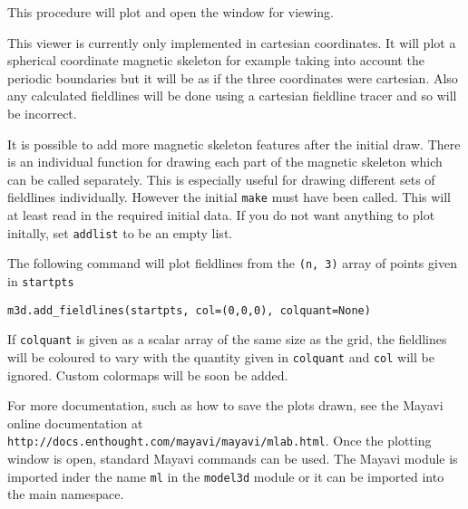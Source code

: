\documentclass[12pt]{article}
\begin{document}
      This procedure will plot and open the window for viewing.

      This viewer is currently only implemented in cartesian coordinates. It will plot a spherical coordinate magnetic skeleton for example taking into account the periodic boundaries but it will be as if the three coordinates were cartesian. Also any calculated fieldlines will be done using a cartesian fieldline tracer and so will be incorrect.

      It is possible to add more magnetic skeleton features after the initial draw. There is an individual function for drawing each part of the magnetic skeleton which can be called separately. This is especially useful for drawing different sets of fieldlines individually. However the initial \texttt{make} must have been called. This will at least read in the required initial data. If you do not want anything to plot initally, set \texttt{addlist} to be an empty list.

      The following command will plot fieldlines from the \texttt{(n, 3)} array of points given in \texttt{startpts}
      
      \texttt{m3d.add\_fieldlines(startpts, col=(0,0,0), colquant=None)}

      If \texttt{colquant} is given as a scalar array of the same size as the grid, the fieldlines will be coloured to vary with the quantity given in \texttt{colquant} and \texttt{col} will be ignored. Custom colormaps will be soon be added.

      For more documentation, such as how to save the plots drawn, see the Mayavi online documentation at \texttt{http://docs.enthought.com/mayavi/mayavi/mlab.html}. Once the plotting window is open, standard Mayavi commands can be used. The Mayavi module is imported inder the name \texttt{ml} in the \texttt{model3d} module or it can be imported into the main namespace.


  \printbibliography
\end{document}
